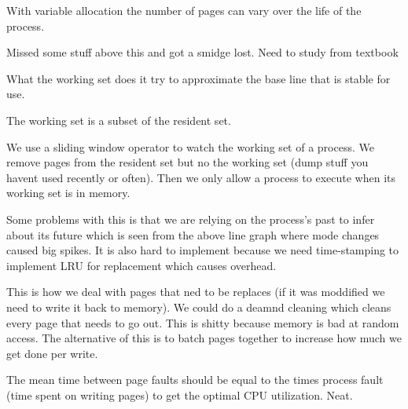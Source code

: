 \documentclass{article}
\begin{document}
With variable allocation the number of pages can vary over the life of the process.





Missed some stuff above this and got a smidge lost. Need to study from textbook

What the working set does it try to approximate the base line that is stable for use.

The working set is a subset of the resident set.

We use a sliding window operator to watch the working set of a process. We remove pages from the resident set but no the working set (dump stuff you havent used recently or often). Then we only allow a process to execute when its working set is in memory.

Some problems with this is that we are relying on the process's past to infer about its future which is seen from the above line graph where mode changes caused big spikes. It is also hard to implement because we need time-stamping to implement LRU for replacement which causes overhead.

This is how we deal with pages that ned to be replaces (if it was moddified we need to write it back to memory). We could do a deamnd cleaning which cleans every page that needs to go out. This is shitty because memory is bad at random access. The alternative of this is to batch pages together to increase how much we get done per write.



The mean time between page faults should be equal to the times process fault (time spent on writing pages) to get the optimal CPU utilization. Neat.


\end{document}
